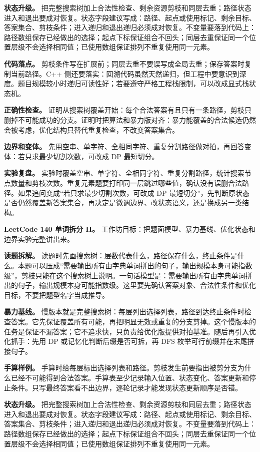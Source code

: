 \textbf{状态升级。} 把完整搜索树加上合法性检查、剩余资源剪枝和同层去重；路径状态进入和退出要成对恢复。状态字段建议写成：路径、起点或使用标记、剩余目标、答案集合、剪枝条件；进入递归和退出递归必须成对恢复。不变量要落到代码上：路径数组保存已经做出的选择；起点下标保证组合不回头；同层去重保证同一个位置层级不会选择相同值；已使用数组保证排列不重复使用同一元素。

\textbf{代码落点。} 剪枝条件写在扩展前；同层去重不要误写成全局去重；保存答案时复制当前路径。C++ 侧还要落实：回溯代码虽然天然递归，但工程中要意识到深度。题目规模较小时递归可读性好；若要遵守严格工程栈限制，可以改成显式栈状态机。

\textbf{正确性检查。} 证明从搜索树覆盖开始：每个合法答案有且只有一条路径，剪枝只删掉不可能成功的分支。证明时把算法和暴力版对齐：暴力能覆盖的合法候选仍然会被考虑，优化结构只替代重复检查，不改变答案集合。

\textbf{边界和变体。} 先用空串、单字符、全相同字符、重复分割路径做对拍，再回答变体：若只求最少切割次数，可改成 DP 最短切分。

\textbf{实验复盘。} 实验时覆盖空串、单字符、全相同字符、重复分割路径，统计搜索节点数量和剪枝次数。重复元素题要打印同一层跳过哪些值，确认没有误删合法路径。如果追问变成“若只求最少切割次数，可改成 DP 最短切分”，先判断原状态是否仍然覆盖新答案集合，再决定是微调边界、改状态语义，还是换成另一类结构。

\noindent\textbf{LeetCode 140 单词拆分 II。} 工作坊目标：把题面模型、暴力基线、优化状态和边界实验完整讲出来。

\textbf{读题拆解。} 读题时先画搜索树：层数代表什么，路径保存什么，终止条件是什么。本题可以压成“需要输出所有由字典单词拼出的句子，输出规模本身可能指数级”，剪枝只能在这个搜索树上说明。一句话模型是：需要输出所有由字典单词拼出的句子，输出规模本身可能指数级。这里要先确认答案对象、合法性条件和优化目标，不要把题型名字当成推导。

\textbf{暴力基线。} 慢版本就是完整搜索树：每层列出选择列表，路径到达终止条件时检查答案。它先保证覆盖所有可能，再把明显无效或重复的分支剪掉。这个慢版本的任务是保证不漏答案；它不追求快，只负责给优化版提供对拍基准。随后再引入优化抓手：先用 DP 或记忆化判断后缀是否可拆，再 DFS 枚举可行前缀并在末尾拼接句子。

\textbf{手算样例。} 手算时给每层标出选择列表和路径。剪枝发生前要指出被剪分支为什么已经不可能得到合法答案。手算表至少记录输入位置、状态变化、答案更新和停止条件。只写最终答案看不出边界，逐轮记录才能发现状态更新顺序是否错。

\textbf{状态升级。} 把完整搜索树加上合法性检查、剩余资源剪枝和同层去重；路径状态进入和退出要成对恢复。状态字段建议写成：路径、起点或使用标记、剩余目标、答案集合、剪枝条件；进入递归和退出递归必须成对恢复。不变量要落到代码上：路径数组保存已经做出的选择；起点下标保证组合不回头；同层去重保证同一个位置层级不会选择相同值；已使用数组保证排列不重复使用同一元素。

